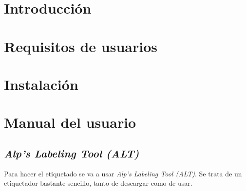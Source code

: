 
\section{Introducción}

\section{Requisitos de usuarios}

\section{Instalación}

\section{Manual del usuario}
\subsection{\textit{Alp’s Labeling Tool (ALT)}}

Para hacer el etiquetado se va a usar \textit{Alp’s Labeling Tool (ALT)}.
Se trata de un etiquetador bastante sencillo, tanto de descargar como de usar.
